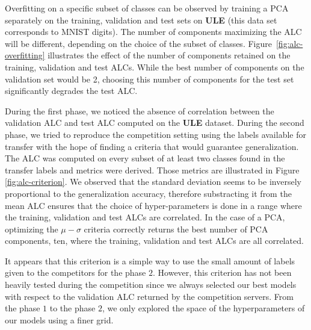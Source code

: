 Overfitting on a specific subset of classes can be observed by training a PCA
separately on the training, validation and test sets on {\bf ULE} (this data
set corresponds to MNIST digits). The number of components maximizing the ALC
will be different, depending on the choice of the subset of classes.
Figure~\ref{fig:alc-overfitting} illustrates the effect of the number of
components retained on the training, validation and test ALCs.  While the best
number of components on the validation set would be 2, choosing this number of
components for the test set significantly degrades the test ALC. 

During the first phase, we noticed the absence of correlation between the validation
ALC and test ALC computed on the {\bf ULE} dataset. During the second phase, we tried
to reproduce the competition setting using the labels available for transfer
with the hope of finding a criteria that would guarantee generalization. The
ALC was computed on every subset of at least two classes found in the transfer
labels and metrics were derived. Those metrics are illustrated in Figure
\ref{fig:alc-criterion}. We observed that the standard deviation seems to be
inversely proportional to the generalization accuracy, therefore substracting it from
the mean ALC ensures that the choice of hyper-parameters is done in a range where
the training, validation and test ALCs are correlated. In the case of a PCA, optimizing
the $\mu - \sigma$ criteria correctly returns the best number of PCA
components, ten, where the training, validation and test ALCs are all correlated.

It appears that this criterion is a simple way to use the small amount of
labels given to the competitors for the phase $2$. However, this criterion has
not been heavily tested during the competition since we always selected our
best models with respect to the validation ALC returned by the competition
servers. From the phase $1$ to the phase $2$, we only explored the space of the
hyperparameters of our models using a finer grid.

